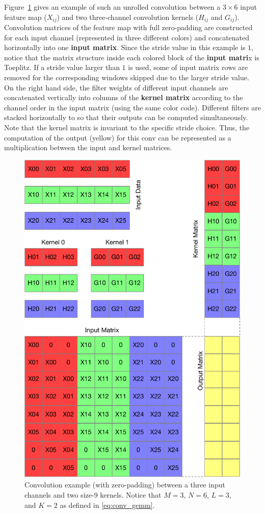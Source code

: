 \documentclass{article}
\begin{document}
Figure~\ref{fig:gemm} gives an example of such an unrolled convolution between a $3 \times 6$ input feature map ($X_{ij}$) and two three-channel convolution kernels ($H_{ij}$ and $G_{ij}$).
Convolution matrices of the feature map with full zero-padding are constructed for each input channel (represented in three different colors) and concatenated horizontally into one \textbf{input matrix}. 
Since the stride value in this example is $1$, notice that the matrix structure inside each colored block of the \textbf{input matri}x is Toeplitz.
If a stride value larger than $1$ is used, some of input matrix rows are removed for the corresponding windows skipped due to the larger stride value.
On the right hand side, the filter weights of different input channels are concatenated vertically  into columns of the \textbf{kernel matrix} according to the channel order in the input matrix (using the same color code).
Different filters are stacked horizontally to so that their outputs can be computed simultaneously.
Note that the kernel matrix is invariant to the specific stride choice.
Thus, the computation of the output (yellow) for this \gls{conv} can be represented as a multiplication between the input and kernel matrices.
%
\begin{figure}
    \centering
    \includegraphics[width=0.9\columnwidth]{gemm}
    \caption{Convolution example (with zero-padding) between a three input channels and two size-9 kernels. Notice that $M=3$, $N=6$, $L=3$, and $K=2$ as defined in \eqref{eq:conv_gemm}.}
    \label{fig:gemm}
\end{figure}
%
\end{document}
